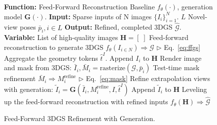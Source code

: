 \begin{figure}[t]
\begin{algorithm}[H]
\caption{Feed-Forward 3DGS Refinement with Generation.}
\label{alg:optim}
\begin{algorithmic}[1]
\STATE \textbf{Function:} Feed-Forward Reconstruction Baseline $f_{\theta}(\cdot)$, generation model $\mathbf{G}(\cdot)$.
\STATE \textbf{Input: }Sparse inputs of N images $\{I_i\}_{i=1}^N$. $L$ Novel-view poses $\bar{p}_i, i\in L$
\STATE \textbf{Output: }Refined, completed 3DGS $\hat{\mathcal{G}}$. 
\STATE \textbf{Variable:} List of high-quality images $\mathbf{H}=[\;]$
\STATE Feed-forward reconstruction to generate 3DGS $f_\theta(I_{i\in N})\Rightarrow \mathcal{G}$ \hfill $\triangleright$ Eq.~\eqref{eq:ffgs}
\STATE Aggregate the geometry tokens $\hat{t}^I$.
    \STATE Append ${I}_i$ to $\mathbf{H}$
\ENDFOR
{}
    \STATE Render image and mask from 3DGS: $\bar{I}_i, \bar{M}_i = \text{rasterize}(\mathcal{G}, \bar{p}_i)$
    \STATE Test-time mask refinement $\bar{M}_i \Rightarrow{{M}}^{\text{refine}}_i$ \hfill $\triangleright$ Eq.~\eqref{eq:mask}
    \STATE Refine extrapolation views with generation: $\tilde{I}_i = \mathbf{G}(\bar{I}_i, M^{\text{refine}}_i, I, \hat{t}^I)$
    \STATE Append $\tilde{I}_i$ to $\mathbf{H}$
\ENDFOR
\STATE Leveling up the feed-forward reconstruction with refined inputs $f_\theta(\mathbf{H})\Rightarrow \hat{\mathcal{G}}$ 
\end{algorithmic}
\end{algorithm}
\end{figure}